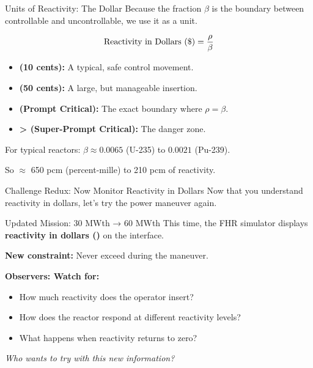 \documentclass[aspectratio=169]{beamer}
\begin{document}
\begin{frame}[allowframebreaks]{Units of Reactivity: The Dollar}
    Because the fraction $\beta$ is the boundary between controllable and uncontrollable, we use it as a unit.

    $$ \text{Reactivity in Dollars (\textdollar)} = \frac{\rho}{\beta} $$

    \begin{itemize}
        \item \textbf{ (10 cents):} A typical, safe control movement.
        \item \textbf{ (50 cents):} A large, but manageable insertion.
        \item \textbf{ (Prompt Critical):} The exact boundary where $\rho = \beta$.
        \item \textbf{>  (Super-Prompt Critical):} The danger zone.
    \end{itemize}

    \vspace{1em}
    For typical reactors: $\beta \approx 0.0065$ (U-235) to $0.0021$ (Pu-239).
    
    So  $\approx$ 650 pcm (percent-mille) to 210 pcm of reactivity.
\end{frame}

\begin{frame}[allowframebreaks]{Challenge Redux: Now Monitor Reactivity in Dollars}
    \centering
    Now that you understand reactivity in dollars, let's try the power maneuver again.

    \vspace{1em}
    \begin{block}{Updated Mission: 30 MWth → 60 MWth}
        This time, the FHR simulator displays \textbf{reactivity in dollars (\textdollar)} on the interface.
        
        \vspace{0.5em}
        \textbf{New constraint:} Never exceed \textbf{} during the maneuver.
    \end{block}

    \vspace{1em}
    \textbf{Observers: Watch for:}
    \begin{itemize}
        \item How much reactivity does the operator insert?
        \item How does the reactor respond at different reactivity levels?
        \item What happens when reactivity returns to zero?
    \end{itemize}

    \vspace{1em}
    \textit{Who wants to try with this new information?}
\end{frame}
\end{document}
